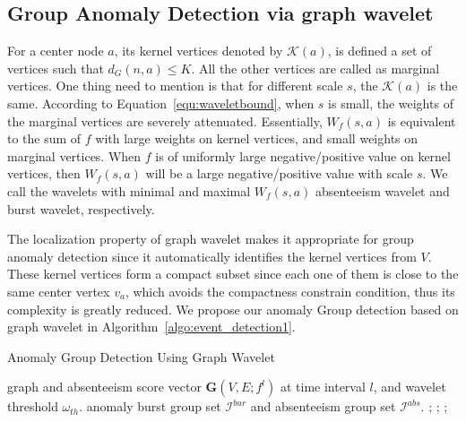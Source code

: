 \subsection{Group Anomaly Detection via graph wavelet}
\label{sec:Group_Anomaly_Detection_via_graph_wavelet}
For a center node $a$, its kernel vertices denoted by $\mathcal{K}(a)$, is defined a set of vertices such that $d_G(n,a)\leq K$. All the other vertices are called as marginal vertices. One thing need to mention is that for different scale $s$, the $\mathcal{K}({a})$ is the same.
According to Equation~\ref{equ:waveletbound}, when $s$ is small, the weights of the marginal vertices are severely attenuated.
Essentially, $W_f(s,a)$ is equivalent to the sum of $f$ with large weights on kernel vertices, and small weights on marginal vertices.
When $f$ is of uniformly large negative/positive value on kernel vertices, then $W_f(s,a)$ will be a large negative/positive value with scale $s$.
We call the wavelets with minimal and maximal $W_f(s,a)$ absenteeism wavelet and burst wavelet, respectively.


The localization property of graph wavelet makes it appropriate for group anomaly detection since it automatically identifies the kernel vertices from $V$.  These kernel vertices form a compact subset since each one of them is close to the same center vertex $v_a$, which avoids the compactness constrain condition, thus its complexity is greatly reduced. We propose our anomaly Group detection based on graph wavelet in Algorithm~\ref{algo:event_detection1}.



\begin{algorithm}[ht]
\centering
\captionsetup{font=scriptsize}
\caption{Anomaly Group Detection Using Graph Wavelet}
{\footnotesize \begin{algorithmic}[1]
 graph and absenteeism score vector $\mathbf{G}(V,E;f^l)$ at time interval $l$, and wavelet threshold $\omega_{th}$.
 anomaly burst group set $\mathcal{I}^{bur}$ and absenteeism group set $\mathcal{I}^{abs}$.	
;
;
	    ;
	    \ENDIF
	
	    \ENDIF	
	
\ENDFOR	
{}
\end{algorithmic}}
\label{algo:event_detection1}
\end{algorithm}


